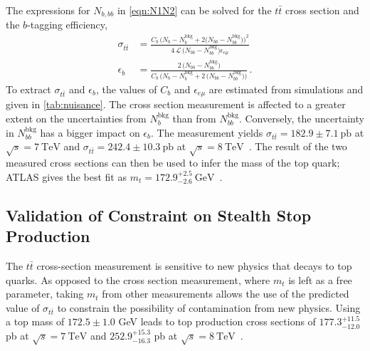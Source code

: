 \documentclass[a4paper,12pt]{article}
\newcommand{\tev}{~\text{TeV}}
\newcommand{\gev}{~\text{GeV}}
\newcommand{\Lc}{\mathcal{L}}
\begin{document}
The expressions for $N_{b,bb}$ in \cref{eqn:N1N2} can be solved for the $t\bar{t}$ cross section and the $b$-tagging efficiency, 
\begin{equation}
\begin{aligned}
\sigma_{t\bar{t}} &= \frac{C_b \, \Big(N_b - N_b^{\text{bkg}} + 2 \big(N_{bb} -N_{bb}^{\text{bkg}}\big) \Big)^2}{4 \, \Lc \, \big(N_{bb} - N_{bb}^{\text{bkg}} \big) \epsilon_{e\mu}} \\[10pt]
\epsilon_b & = \frac{2 \, \big( N_{bb} - N_{bb}^{\text{bkg}} \big)}{C_b \, \Big( N_b - N_b^{\text{bkg}} + 2\,\big(N_{bb} - N_{bb}^{\text{bkg}} \big) \Big)}\,.
\end{aligned}
\end{equation}
To extract $\sigma_{t\bar{t}}$ and $\epsilon_b$, the values of $C_b$ and $\epsilon_{e\mu}$ are estimated from simulations and given in \cref{tab:nuisance}. The cross section measurement is affected to a greater extent on the uncertainties from $N_b^{\text{bkg}}$ than from $N_{bb}^{\text{bkg}}$. Conversely, the uncertainty in $N_{bb}^{\text{bkg}}$ has a bigger impact on $\epsilon_b$. The measurement yields $\sigma_{t\bar{t}} = 182.9 \pm 7.1~\text{pb}$ at $\sqrt{s}=7\tev$ and $\sigma_{t\bar{t}} = 242.4 \pm 10.3~\text{pb}$ at $\sqrt{s}=8\tev$~\cite{TOPQ-2013-04}. The result of the two measured cross sections can then be used to infer the mass of the top quark; ATLAS gives the best fit as $m_t = 172.9^{+2.5}_{-2.6} \gev$~\cite{TOPQ-2013-04}.

\subsection{Validation of Constraint on Stealth Stop Production}

The $t\bar{t}$ cross-section measurement is sensitive to new physics that decays to top quarks.  As opposed to the cross section measurement, where $m_t$ is left as a free parameter, taking $m_t$ from other measurements allows the use of the predicted value of $\sigma_{t\bar{t}}$ to constrain the possibility of contamination from new physics. Using a top mass of $172.5 \pm 1.0$ GeV leads to top production cross sections of $177.3^{+11.5}_{-12.0}$ pb at $\sqrt{s}=7\tev$ and $252.9^{+15.3}_{-16.3}$ pb at $\sqrt{s}=8\tev$~\cite{TOPQ-2013-04,Beneke:2011mq,Cacciari:2011hy,Czakon:2012zr,Czakon:2012pz,Czakon:2013goa,Czakon:2011xx}. 
\end{document}
